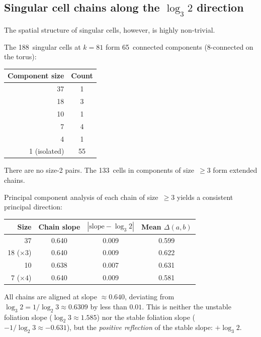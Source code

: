 \documentclass[11pt,a4paper]{article}
\theoremstyle{plain}
\theoremstyle{definition}
\begin{document}
\subsection{Singular cell chains along the $\log_3 2$ direction}

The spatial structure of singular cells, however, is highly non-trivial.

\begin{empirical}\label{obs:components}
    The 188~singular cells at $k = 81$ form 65~connected components
    (8-connected on the torus):
    \begin{center}
    \renewcommand{\arraystretch}{1.15}
    \begin{tabular}{rc}
        \toprule
        Component size & Count \\
        \midrule
        37 & 1 \\
        18 & 3 \\
        10 & 1 \\
        7 & 4 \\
        4 & 1 \\
        1 (isolated) & 55 \\
        \bottomrule
    \end{tabular}
    \end{center}
    There are no size-2 pairs.  The 133~cells in components of
    size~$\geq 3$ form extended chains.
\end{empirical}

\begin{empirical}\label{obs:chain-slope}
    Principal component analysis of each chain of size~$\geq 3$ yields a
    consistent principal direction:
    \begin{center}
    \renewcommand{\arraystretch}{1.15}
    \begin{tabular}{rccc}
        \toprule
        Size & Chain slope & $|\mathrm{slope} - \log_3 2|$ & Mean $\Delta(a,b)$ \\
        \midrule
        37 & 0.640 & 0.009 & 0.599 \\
        18 ($\times 3$) & 0.640 & 0.009 & 0.622 \\
        10 & 0.638 & 0.007 & 0.631 \\
        7 ($\times 4$) & 0.640 & 0.009 & 0.581 \\
        \bottomrule
    \end{tabular}
    \end{center}
    All chains are aligned at slope $\approx 0.640$, deviating from
    $\log_3 2 = 1/\log_2 3 \approx 0.6309$ by less than $0.01$.  This
    is neither the unstable foliation slope ($\log_2 3 \approx 1.585$)
    nor the stable foliation slope ($-1/\log_2 3 \approx -0.631$), but
    the \emph{positive reflection} of the stable slope: $+\log_3 2$.
\end{empirical}
\end{document}
